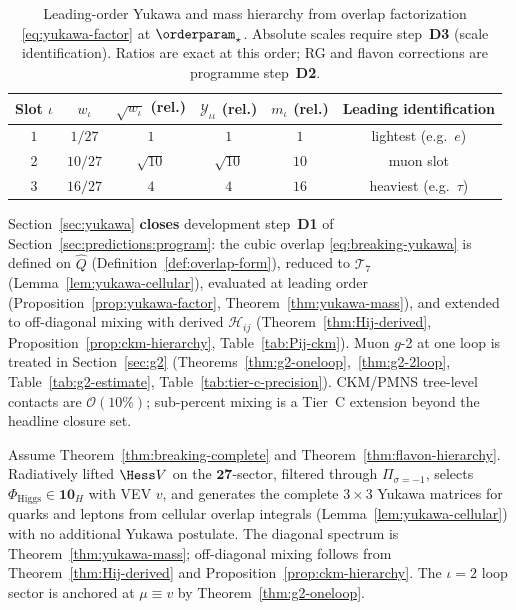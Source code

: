 \begin{table}[ht]
\centering
\small
\renewcommand{\arraystretch}{1.12}
\begin{tabular}{@{}cccccc@{}}
\toprule
\textbf{Slot $\iota$} & $w_\iota$ & $\sqrt{w_\iota}$ (rel.) &
$\mathcal{Y}_{\iota\iota}$ (rel.) & $m_\iota$ (rel.) &
\textbf{Leading identification} \\
\midrule
$1$ & $1/27$  & $1$        & $1$        & $1$  & lightest (e.g.\ $e$) \\
$2$ & $10/27$ & $\sqrt{10}$ & $\sqrt{10}$ & $10$ & muon slot \\
$3$ & $16/27$ & $4$        & $4$        & $16$ & heaviest (e.g.\ $\tau$) \\
\bottomrule
\end{tabular}
\caption{Leading-order Yukawa and mass hierarchy from overlap factorization
\eqref{eq:yukawa-factor} at $\orderparam_\star$. Absolute scales require
step~\textbf{D3} (scale identification). Ratios are exact at this order;
RG and flavon corrections are programme step~\textbf{D2}.}
\label{tab:yukawa-leading}
\end{table}

\begin{corollary}[D1 closure]\label{cor:yukawa-d1}
Section~\ref{sec:yukawa} \textbf{closes} development step~\textbf{D1} of
Section~\ref{sec:predictions:program}: the cubic overlap
\eqref{eq:breaking-yukawa} is defined on $\hat Q$
(Definition~\ref{def:overlap-form}), reduced to $\mathcal{T}_7$
(Lemma~\ref{lem:yukawa-cellular}), evaluated at leading order
(Proposition~\ref{prop:yukawa-factor}, Theorem~\ref{thm:yukawa-mass}), and
extended to off-diagonal mixing with derived $\mathcal{H}_{ij}$
(Theorem~\ref{thm:Hij-derived}, Proposition~\ref{prop:ckm-hierarchy},
Table~\ref{tab:Pij-ckm}). Muon $g$-2 at one loop is treated in
Section~\ref{sec:g2} (Theorems~\ref{thm:g2-oneloop},~\ref{thm:g2-2loop},
Table~\ref{tab:g2-estimate}, Table~\ref{tab:tier-c-precision}). CKM/PMNS
tree-level contacts are $\mathcal{O}(10\%)$; sub-percent mixing is a
Tier~C extension beyond the headline closure set.
\end{corollary}

\begin{theorem}\label{thm:yukawa-complete}
Assume Theorem~\ref{thm:breaking-complete} and
Theorem~\ref{thm:flavon-hierarchy}. Radiatively lifted $\Hess V$ on the
$\mathbf{27}$-sector, filtered through $\Pi_{\sigma=-1}$, selects
$\Phi_{\mathrm{Higgs}}\in\mathbf{10}_H$ with VEV $v$, and generates the
complete $3\times3$ Yukawa matrices for quarks and leptons from cellular
overlap integrals (Lemma~\ref{lem:yukawa-cellular}) with no additional Yukawa
postulate. The diagonal spectrum is Theorem~\ref{thm:yukawa-mass}; off-diagonal
mixing follows from Theorem~\ref{thm:Hij-derived} and
Proposition~\ref{prop:ckm-hierarchy}. The $\iota=2$ loop sector is anchored at
$\mu\equiv v$ by Theorem~\ref{thm:g2-oneloop}.
\end{theorem}

